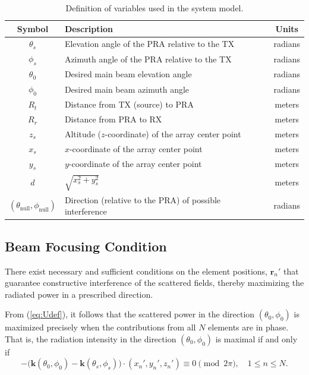 \documentclass[11pt,letterpaper]{article}
\theoremstyle{definition}
\theoremstyle{plain}
\begin{document}
\begin{table}[H]
\centering
\caption{Definition of variables used in the system model.}
\begin{tabular}{c p{9cm} c}
\hline
\textbf{Symbol} & \textbf{Description} & \textbf{Units} \\
\hline
$\theta_s$ & Elevation angle of the PRA relative to the TX & radians \\
$\phi_s$   & Azimuth angle of the PRA relative to the TX & radians \\
$\theta_0$ & Desired main beam elevation angle & radians \\
$\phi_0$   & Desired main beam azimuth angle & radians \\
$R_t$      & Distance from TX (source) to PRA & meters \\
$R_r$      & Distance from PRA to RX  & meters \\
$z_s$      & Altitude ($z$-coordinate) of the array center point & meters \\
$x_s$      & $x$-coordinate of the array center point & meters \\
$y_s$      & $y$-coordinate of the array center point & meters \\
$d$        & \(\sqrt{x_s^2 + y_s^2} \) & meters \\
$(\theta_{\text{null}},\phi_{\text{null}})$ & Direction (relative to the PRA) of possible interference & radians\\

\hline
\end{tabular}
\label{tab:variables}
\end{table}


\subsection{Beam Focusing Condition}
There exist necessary and sufficient conditions on the element positions, $\mathbf{r}_n'$ that guarantee constructive interference of the scattered fields, thereby maximizing the radiated power in a prescribed direction.

From (\ref{eq:Udef}), it follows that the scattered power in the direction $(\theta_0,\phi_0)$ is maximized precisely when the contributions from all $N$ elements are in phase. That is, the radiation intensity in the direction $(\theta_0,\phi_0)$ is maximal if and only if
\begin{equation}
\label{gen_beam_focusing}
-\big( \bm k (\theta_0,\phi_0)-\bm k (\theta_s,\phi_s)\big) \cdot (x_n',y_n',z_n') \equiv 0 \pmod{2\pi}, 
\quad 1 \leq n \leq N.
\end{equation}
\end{document}

